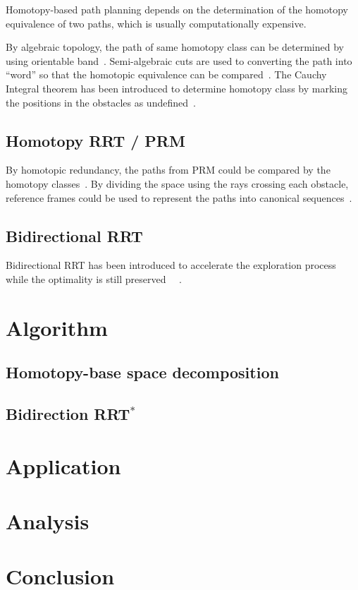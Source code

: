 \documentclass[letterpaper, 10 pt, conference]{ieeeconf}
\begin{document}
Homotopy-based path planning depends on the determination of the homotopy equivalence of two paths, which is usually computationally expensive.

By algebraic topology, the path of same homotopy class can be determined by using orientable band~\cite{Hershberger199463}.
Semi-algebraic cuts are used to converting the path into ``word'' so that the homotopic equivalence can be compared~\cite{Grigoriev:1998:PAS:281508.281528}.
The Cauchy Integral theorem has been introduced to determine homotopy class by marking the positions in the obstacles as undefined~\cite{AAAI101920}.

\subsection{Homotopy RRT / PRM}

By homotopic redundancy, the paths from PRM could be compared by the homotopy classes~\cite{1041613}.
By dividing the space using the rays crossing each obstacle, reference frames could be used to represent the paths into canonical sequences~\cite{Hernandez201544}.

\subsection{Bidirectional RRT}

Bidirectional RRT has been introduced to accelerate the exploration process while the optimality is still preserved~
\cite{Jordan.Perez.ea:CSAIL13}~\cite{starek2014bidirectional}.

\section{Algorithm}
\label{sec:algorithm}

\subsection{Homotopy-base space decomposition}

\subsection{Bidirection RRT$^{*}$}

\section{Application}
\label{sec:application}

\section{Analysis}
\label{sec:analysis}

\section{Conclusion}
\label{sec:conclusion}



\end{document}
